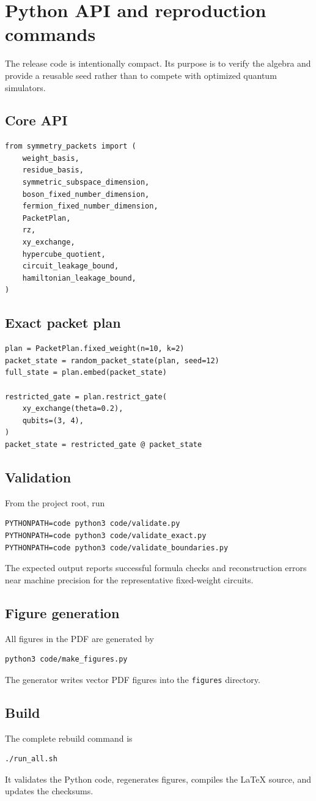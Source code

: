 \chapter{Python API and reproduction commands}
\label{app:python}

The release code is intentionally compact. Its purpose is to verify the algebra and provide a reusable seed rather than to compete with optimized quantum simulators.

\section{Core API}
\begin{lstlisting}[style=pythonstyle,caption={Core packet API.}]
from symmetry_packets import (
    weight_basis,
    residue_basis,
    symmetric_subspace_dimension,
    boson_fixed_number_dimension,
    fermion_fixed_number_dimension,
    PacketPlan,
    rz,
    xy_exchange,
    hypercube_quotient,
    circuit_leakage_bound,
    hamiltonian_leakage_bound,
)
\end{lstlisting}

\section{Exact packet plan}
\begin{lstlisting}[style=pythonstyle,caption={Fixed-weight packet compilation.}]
plan = PacketPlan.fixed_weight(n=10, k=2)
packet_state = random_packet_state(plan, seed=12)
full_state = plan.embed(packet_state)

restricted_gate = plan.restrict_gate(
    xy_exchange(theta=0.2),
    qubits=(3, 4),
)
packet_state = restricted_gate @ packet_state
\end{lstlisting}

\section{Validation}
From the project root, run
\begin{lstlisting}[style=pythonstyle]
PYTHONPATH=code python3 code/validate.py
PYTHONPATH=code python3 code/validate_exact.py
PYTHONPATH=code python3 code/validate_boundaries.py
\end{lstlisting}
The expected output reports successful formula checks and reconstruction errors near machine precision for the representative fixed-weight circuits.

\section{Figure generation}
All figures in the PDF are generated by
\begin{lstlisting}[style=pythonstyle]
python3 code/make_figures.py
\end{lstlisting}
The generator writes vector PDF figures into the \texttt{figures} directory.

\section{Build}
The complete rebuild command is
\begin{lstlisting}[style=pythonstyle]
./run_all.sh
\end{lstlisting}
It validates the Python code, regenerates figures, compiles the LaTeX source, and updates the checksums.
